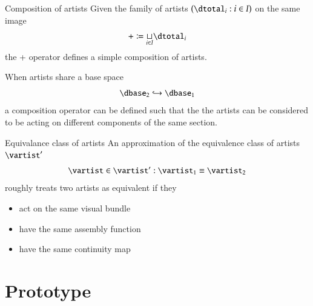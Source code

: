 \documentclass[xcolor={dvipsnames}, handout]{beamer}
\begin{document}
\begin{frame}{Composition of artists}
    Given the family of artists $(\dtotal_i: i\in I)$ on the same image
    \begin{equation}
        + \coloneqq \underset{i\in I}{\sqcup} \dtotal_{i}
    \end{equation}
    the + operator defines a simple composition of artists. 

    When artists share a base space 
    \begin{equation}
        \dbase_2 \hookrightarrow \dbase_1
    \end{equation}
    a composition operator can be defined such that the the artists can be considered to be acting on different components of the same section. 
\end{frame}
\begin{frame}{Equivalance class of artists}
    An approximation of the equivalence class of artists $\vartist^{\prime}$
    \begin{equation}
    \vartist \in \vartist^{\prime}: \vartist_{1} \equiv \vartist_{2}
    \end{equation}
    roughly treats two artists as equivalent if they 
    \begin{itemize}
        \item act on the same visual bundle \vtotal
        \item have the same assembly function \vmarkd 
        \item have the same continuity map \vindex 
    \end{itemize}
\end{frame}


\section{Prototype}
\end{document}
